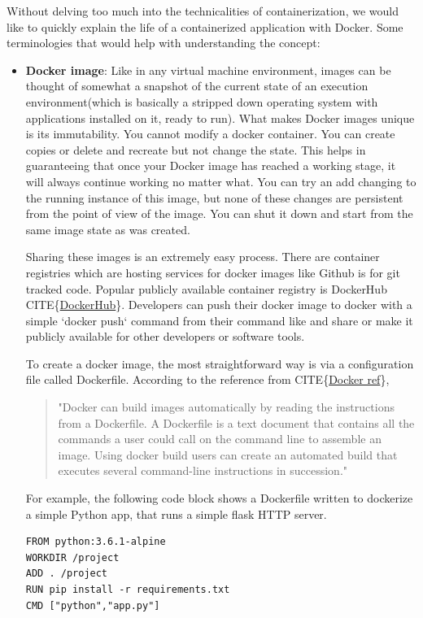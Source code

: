 \documentclass[12pt,titlepage]{article}
\begin{document}
Without delving too much into the technicalities of containerization, we would
like to quickly explain the life of a containerized application with Docker.
Some terminologies that would help with understanding the concept:
\begin{itemize}
\item \textbf{Docker image}: Like in any virtual machine environment, images can be thought of somewhat a
snapshot of the current state of an execution environment(which is basically a
stripped down operating system with applications installed on it, ready to run).
What makes Docker images unique is its immutability. You cannot modify a docker
container. You can create copies or delete and recreate but not change the
state. This helps in guaranteeing that once your Docker image has reached a
working stage, it will always continue working no matter what. You can try an
add changing to the running instance of this image, but none of these changes
are persistent from the point of view of the image. You can shut it down and
start from the same image state as was created.

Sharing these images is an extremely easy process. There are container
registries which are hosting services for docker images like Github is for git
tracked code. Popular publicly available container registry is DockerHub
CITE\{\href{https://hub.docker.com/}{DockerHub}\}. Developers can push their docker image to docker with a simple
`docker push` command from their command like and share or make it publicly
available for other developers or software tools.

To create a docker image, the most straightforward way is via a configuration
file called Dockerfile. According to the reference from CITE\{\href{https://docs.docker.com/engine/reference/builder/}{Docker ref}\},

\begin{quote}

"Docker can build images automatically by reading the instructions from a
Dockerfile. A Dockerfile is a text document that contains all the commands a
user could call on the command line to assemble an image. Using docker build
users can create an automated build that executes several command-line
instructions in succession."
\end{quote}

For example, the following code block shows a Dockerfile written to dockerize a
simple Python app, that runs a simple flask HTTP server.

\begin{lstlisting}
FROM python:3.6.1-alpine
WORKDIR /project
ADD . /project
RUN pip install -r requirements.txt
CMD ["python","app.py"]
\end{lstlisting}


\end{itemize}
\end{document}
